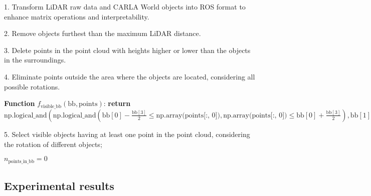 \begin{algorithm}[H]
	\SetAlgoLined
	
	\caption{Ray-tracing-based filtering algorithm to perform object visibility}
	\label{alg:8_ray_tracing_object_visibility}
	
	\BlankLine
	
	1. Transform LiDAR raw data and CARLA World objects into \ac{ROS} format to enhance matrix operations and interpretability.
	
	2. Remove objects furthest than the maximum LiDAR distance.
	
	3. Delete points in the point cloud with heights higher or lower than the objects in the surroundings.
	
	4. Eliminate points outside the area where the objects are located, considering all possible rotations.
	
	\BlankLine
	
	\textbf{Function} $f_{\text{visible\_bb}}(\text{bb}, \text{points})$:\;
	\Indp
	\textbf{return} $\text{np.logical\_and} \left( \text{np.logical\_and} \left( \text{bb}[0] - \frac{\text{bb}[3]}{2} \leq \text{np.array(points[:, 0])}, \text{np.array(points[:, 0])} \leq \text{bb}[0] + \frac{\text{bb}[3]}{2} \right), \text{bb}[1] - \frac{\text{bb}[4]}{2} \leq \text{np.array(points[:, 1])} \right), \text{bb}[2] - \frac{\text{bb}[5]}{2} \leq \text{np.array(points[:, 2])} \leq \text{bb}[2] + \frac{\text{bb}[5]}{2} $\;
	\Indm
	
	\BlankLine
	
	5. Select visible objects having at least one point in the point cloud, considering the rotation of different objects;
	
	\BlankLine
	
	$n_{\text{points\_in\_bb}} = 0$\;

\end{algorithm}

\subsection{Experimental results}
\label{subsec:8_experimental_results}

